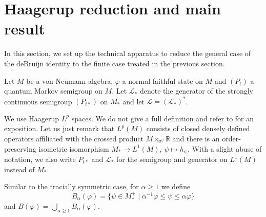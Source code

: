 \documentclass[12pt,a4paper]{amsart}
\newcommand{\1}{\mathds{1}}
\renewcommand{\phi}{\varphi}
\renewcommand{\L}{\mathcal L}
\newcommand{\IR}{\mathbb R}
\newcommand{\abs}[1]{\lvert#1\rvert}
\newcommand{\norm}[1]{\lVert#1\rVert}
\theoremstyle{plain}
\theoremstyle{definition}
\theoremstyle{remark}
\begin{document}
%
%

\section{Haagerup reduction and main result}

In this section, we set up the technical apparatus to reduce the general case of the deBruijn identity to the finite case treated in the previous section.

Let $M$ be a von Neumann algebra, $\phi$ a normal faithful state on $M$ and $(P_t)$ a quantum Markov semigroup on $M$. Let $\L_\ast$ denote the generator of the strongly continuous semigroup $(P_{t\ast})$ on $M_\ast$ and let $\L=(\L_\ast)^\ast$.

We use Haagerup $L^p$ spaces. We do not give a full definition and refer to \cite{Ter81} for an exposition. Let us just remark that $L^p(M)$ consists of closed densely defined operators affiliated with the crossed product $M\rtimes_{\sigma^\phi}\IR$ and there is an order-preserving isometric isomorphism $M_\ast\to L^1(M)$, $\psi\mapsto h_\psi$. With a slight abuse of notation, we also write $P_{t\ast}$ and $\L_\ast$ for the semigroup and generator on $L^1(M)$ instead of $M_\ast$.

Similar to the tracially symmetric case, for $\alpha\geq 1$ we define 
\begin{equation*}
B_{\alpha}(\phi)=\{\psi\in M_\ast^+\mid \alpha^{-1}\phi\leq \psi\leq \alpha\phi\}
\end{equation*}
and $B(\phi)=\bigcup_{\alpha\geq 1}B_{\alpha}(\phi)$.
\end{document}
